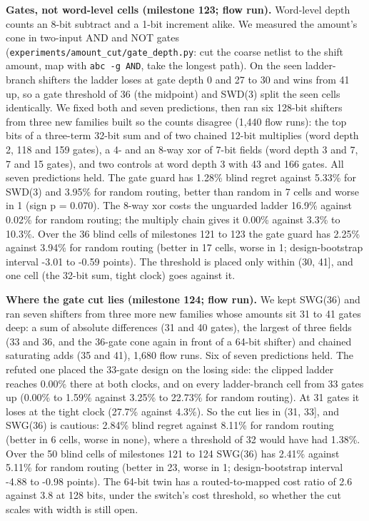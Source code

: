 \documentclass[conference]{IEEEtran}
\begin{document}
\textbf{Gates, not word-level cells (milestone 123; flow run).}
Word-level depth counts an 8-bit subtract and a 1-bit increment alike.
We measured the amount's cone in two-input AND and NOT gates
(\texttt{experiments/\allowbreak{}amount\_\allowbreak{}cut/\allowbreak{}gate\_\allowbreak{}depth.py}: cut the coarse netlist
to the shift amount, map with \texttt{abc\ -g\ AND}, take the longest
path). On the seen ladder-branch shifters the ladder loses at gate depth
0 and 27 to 30 and wins from 41 up, so a gate threshold of 36 (the
midpoint) and SWD(3) split the seen cells identically. We fixed both and
seven predictions, then ran six 128-bit shifters from three new families
built so the counts disagree (1,440 flow runs): the top bits of a
three-term 32-bit sum and of two chained 12-bit multiplies (word depth
2, 118 and 159 gates), a 4- and an 8-way xor of 7-bit fields (word depth
3 and 7, 7 and 15 gates), and two controls at word depth 3 with 43 and
166 gates. All seven predictions held. The gate guard has 1.28\% blind
regret against 5.33\% for SWD(3) and 3.95\% for random routing, better
than random in 7 cells and worse in 1 (sign p = 0.070). The 8-way xor
costs the unguarded ladder 16.9\% against 0.02\% for random routing; the
multiply chain gives it 0.00\% against 3.3\% to 10.3\%. Over the 36
blind cells of milestones 121 to 123 the gate guard has 2.25\% against
3.94\% for random routing (better in 17 cells, worse in 1;
design-bootstrap interval -3.01 to -0.59 points). The threshold is
placed only within (30, 41{]}, and one cell (the 32-bit sum, tight
clock) goes against it.

\textbf{Where the gate cut lies (milestone 124; flow run).} We kept
SWG(36) and ran seven shifters from three more new families whose
amounts sit 31 to 41 gates deep: a sum of absolute differences (31 and
40 gates), the largest of three fields (33 and 36, and the 36-gate cone
again in front of a 64-bit shifter) and chained saturating adds (35 and
41), 1,680 flow runs. Six of seven predictions held. The refuted one
placed the 33-gate design on the losing side: the clipped ladder reaches
0.00\% there at both clocks, and on every ladder-branch cell from 33
gates up (0.00\% to 1.59\% against 3.25\% to 22.73\% for random
routing). At 31 gates it loses at the tight clock (27.7\% against
4.3\%). So the cut lies in (31, 33{]}, and SWG(36) is cautious: 2.84\%
blind regret against 8.11\% for random routing (better in 6 cells, worse
in none), where a threshold of 32 would have had 1.38\%. Over the 50
blind cells of milestones 121 to 124 SWG(36) has 2.41\% against 5.11\%
for random routing (better in 23, worse in 1; design-bootstrap interval
-4.88 to -0.98 points). The 64-bit twin has a routed-to-mapped cost
ratio of 2.6 against 3.8 at 128 bits, under the switch's cost threshold,
so whether the cut scales with width is still open.
\end{document}
